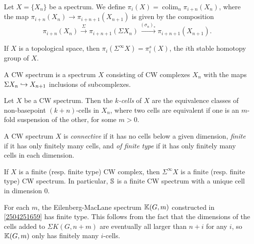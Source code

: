 \documentclass{MetricNotes2023}
\def\bb{\ensuremath\mathbb}
\def\inj{\ensuremath\hookrightarrow}
\DeclareMathOperator{\colim}{colim}
\begin{document}

\begin{definition}
Let \(X=\{X_n\}\) be a spectrum. We define \(\pi_i(X)=\colim_n \pi_{i+n}(X_n)\), where the map \(\pi_{i+n}(X_n)\to \pi_{i+n+1}(X_{n+1})\) is given by the composition
\[\pi_{i+n}(X_n)\xrightarrow{\Sigma}\pi_{i+n+1}(\Sigma X_n)\xrightarrow{(\sigma_n)_*}\pi_{i+n+1}(X_{n+1}).\]
\end{definition}

\begin{example}
If \(X\) is a topological space, then \(\pi_i(\Sigma^\infty X)=\pi_i^s(X)\), the \(i\)th stable homotopy group of \(X\). 
\end{example}

\begin{definition}
A CW spectrum is a spectrum \(X\) consisting of CW complexes \(X_n\) with the maps \(\Sigma X_n \inj X_{n+1}\) inclusions of subcomplexes. 
\end{definition}

\begin{definition}
Let \(X\) be a CW spectrum. Then the \textit{\(k\)-cells} of \(X\) are the equivalence classes of non-basepoint \((k+n)\)-cells in \(X_n\), where two cells are equivalent if one is an \(m\)-fold suspension of the other, for some \(m>0\). 
\end{definition}


\begin{definition}
A CW spectrum \(X\) is \textit{connective} if it has no cells below a given dimension, \textit{finite} if it has only finitely many cells, and \textit{of finite type} if it has only finitely many cells in each dimension.
\end{definition}

\begin{example}
If \(X\) is a finite (resp. finite type) CW complex, then \(\Sigma^\infty X\) is a finite (resp. finite type) CW spectrum. In particular, \(\bb{S}\) is a finite CW spectrum with a unique cell in dimension 0.
\end{example}

\begin{example}\label{2504251704}
For each \(m\), the Eilenberg-MacLane spectrum \(\bb{K}(G, m)\) constructed in \ref{2504251659} has finite type. This follows from the fact that the dimensions of the cells added to \(\Sigma K(G,n+m)\) are eventually all  larger than \(n+i\) for any \(i\), so \(\bb{K}(G, m)\) only has finitely many \(i\)-cells. 
\end{example}
\end{document}
